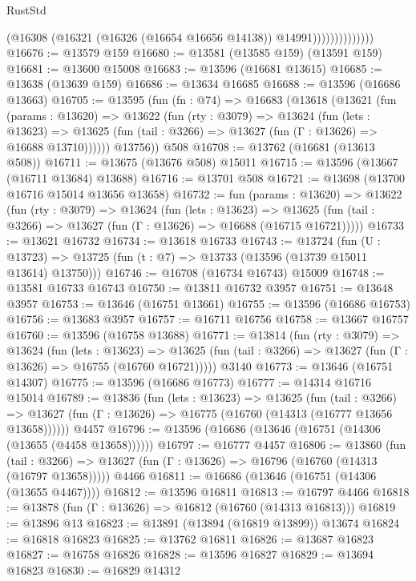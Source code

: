 \begin{lexlean}{RustStd}
\begin{coremodule}
{\begin{coremodule}
{{{{{{{{{{{{{{{{{{{{{{{{{{{{{{{{{{{{{{{                            (@16308 (@16321 (@16326 (@16654 @16656 @14138)) @14991))))))))))))))
@16676 := @13579 @159
@16680 := @13581 (@13585 @159) (@13591 @159)
@16681 := @13600 @15008
@16683 := @13596 (@16681 @13615)
@16685 := @13638 (@13639 @159)
@16686 := @13634 @16685
@16688 := @13596 (@16686 @13663)
@16705 := @13595
    (fun (fn : @74) =>
    @16683
      (@13618
        (@13621
          (fun (params : @13620) =>
          @13622
            (fun (rty : @3079) =>
            @13624
              (fun (lets : @13623) =>
              @13625 (fun (tail : @3266) => @13627 (fun (Γ : @13626) => @16688 @13710))))))
        @13756))
    @508
@16708 := @13762 (@16681 (@13613 @508))
@16711 := @13675 (@13676 @508) @15011
@16715 := @13596 (@13667 (@16711 @13684) @13688)
@16716 := @13701 @508
@16721 := @13698 (@13700 @16716 @15014 @13656 @13658)
@16732 := fun (params : @13620) =>
  @13622
    (fun (rty : @3079) =>
    @13624
      (fun (lets : @13623) =>
      @13625 (fun (tail : @3266) => @13627 (fun (Γ : @13626) => @16688 (@16715 @16721)))))
@16733 := @13621 @16732
@16734 := @13618 @16733
@16743 := @13724
    (fun (U : @13723) => @13725 (fun (t : @7) => @13733 (@13596 (@13739 @15011 @13614) @13750)))
@16746 := @16708 (@16734 @16743) @15009
@16748 := @13581 @16733 @16743
@16750 := @13811 @16732 @3957
@16751 := @13648 @3957
@16753 := @13646 (@16751 @13661)
@16755 := @13596 (@16686 @16753)
@16756 := @13683 @3957
@16757 := @16711 @16756
@16758 := @13667 @16757
@16760 := @13596 (@16758 @13688)
@16771 := @13814
    (fun (rty : @3079) =>
    @13624
      (fun (lets : @13623) =>
      @13625 (fun (tail : @3266) => @13627 (fun (Γ : @13626) => @16755 (@16760 @16721)))))
    @3140
@16773 := @13646 (@16751 @14307)
@16775 := @13596 (@16686 @16773)
@16777 := @14314 @16716 @15014
@16789 := @13836
    (fun (lets : @13623) =>
    @13625
      (fun (tail : @3266) =>
      @13627 (fun (Γ : @13626) => @16775 (@16760 (@14313 (@16777 @13656 @13658))))))
    @4457
@16796 := @13596 (@16686 (@13646 (@16751 (@14306 (@13655 (@4458 @13658))))))
@16797 := @16777 @4457
@16806 := @13860
    (fun (tail : @3266) => @13627 (fun (Γ : @13626) => @16796 (@16760 (@14313 (@16797 @13658)))))
    @4466
@16811 := @16686 (@13646 (@16751 (@14306 (@13655 @4467))))
@16812 := @13596 @16811
@16813 := @16797 @4466
@16818 := @13878 (fun (Γ : @13626) => @16812 (@16760 (@14313 @16813)))
@16819 := @13896 @13
@16823 := @13891 (@13894 (@16819 @13899)) @13674
@16824 := @16818 @16823
@16825 := @13762 @16811
@16826 := @13687 @16823
@16827 := @16758 @16826
@16828 := @13596 @16827
@16829 := @13694 @16823
@16830 := @16829 @14312
}}}}}}}}}}}}}}}}}}}}}}}}}}}}}}}}}}}}}}}
\end{coremodule}}
\end{coremodule}
\end{lexlean}
